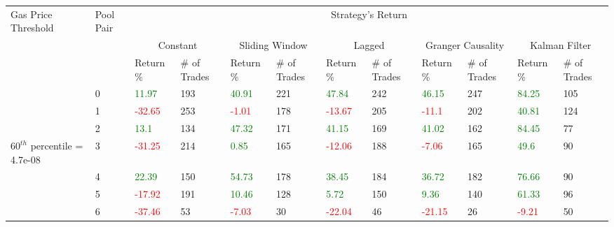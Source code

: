 \begin{table}[htb!]
    \centering
    \begin{adjustwidth}{-0.9in}{-0.9in}
        \begin{tabular}{|p{5em}|p{2em}|p{3em}|p{3em}|p{3em}|p{3em}|p{3em}|p{3em}|p{3em}|p{3em}|p{3em}|p{3em}|}\hline
            Gas Price Threshold & Pool Pair & \multicolumn{10}{|c|}{Strategy's Return} \\\cline{3-12}
            &   & \multicolumn{2}{|c|}{Constant} & \multicolumn{2}{|c|}{Sliding Window} & \multicolumn{2}{|c|}{Lagged} & \multicolumn{2}{|c|}{Granger Causality} & \multicolumn{2}{|c|}{Kalman Filter}\\\cline{3-12}
            & & Return \% & \# of Trades & Return \% & \# of Trades & Return \% & \# of Trades & Return \% & \# of Trades & Return \% & \# of Trades\\\hline
            
            & 0 & \textcolor{green}{11.97} & 193 & \textcolor{green}{40.91} & 221 & \textcolor{green}{47.84} & 242 & \textcolor{green}{46.15} & 247 & \textcolor{green}{84.25} & 105\\\cline{3-12}
            & 1 & \textcolor{red}{-32.65} & 253 & \textcolor{red}{-1.01} & 178 & \textcolor{red}{-13.67} & 205 & \textcolor{red}{-11.1} & 202 & \textcolor{green}{40.81} & 124\\\cline{3-12}
            & 2 & \textcolor{green}{13.1} & 134 & \textcolor{green}{47.32} & 171 & \textcolor{green}{41.15} & 169 & \textcolor{green}{41.02} & 162 & \textcolor{green}{84.45} & 77\\\cline{3-12}
            $60^{th}$ percentile = 4.7e-08 & 3 & \textcolor{red}{-31.25} & 214 & \textcolor{green}{0.85} & 165 & \textcolor{red}{-12.06} & 188 & \textcolor{red}{-7.06} & 165 & \textcolor{green}{49.6} & 90\\[-5.5ex]\cline{3-12}
            & 4 & \textcolor{green}{22.39} & 150 & \textcolor{green}{54.73} & 178 & \textcolor{green}{38.45} & 184 & \textcolor{green}{36.72} & 182 & \textcolor{green}{76.66} & 90\\\cline{3-12}
            & 5 & \textcolor{red}{-17.92} & 191 & \textcolor{green}{10.46} & 128 & \textcolor{green}{5.72} & 150 & \textcolor{green}{9.36} & 140 & \textcolor{green}{61.33} & 96\\\cline{3-12}
            & 6 & \textcolor{red}{-37.46} & 53 & \textcolor{red}{-7.03} & 30 & \textcolor{red}{-22.04} & 46 & \textcolor{red}{-21.15} & 26 & \textcolor{red}{-9.21} & 50\\\hline\hline


\end{tabular}
\end{adjustwidth}
\end{table}
